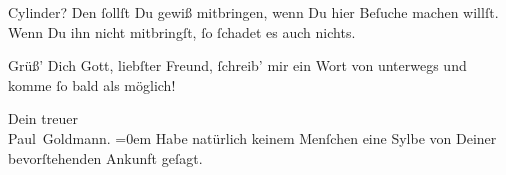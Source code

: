 \pstart
           Cylinder? Den ſollſt Du gewiß mitbringen, wenn Du hier Beſuche machen willſt. Wenn
                  {\pb}Du ihn nicht mitbringſt, ſo ſchadet es auch
               nichts.\pend
           
\pstart
           Grüß’ Dich Gott, liebſter Freund, ſchreib’ mir ein Wort \strikeout{\textcolor{gray}{×}} von unterwegs und komme ſo bald als möglich!\pend
           
\pstart
           Dein treuer {\\[\baselineskip]}\spacefill\mbox{Paul Goldmann.}\pend
           \leftskip=0em{}
\pstart
           \noindent{}Habe natürlich keinem Menſchen eine Sylbe von Deiner bevorſtehenden Ankunft
                  geſagt.\pend
           \endnumbering{}  
      